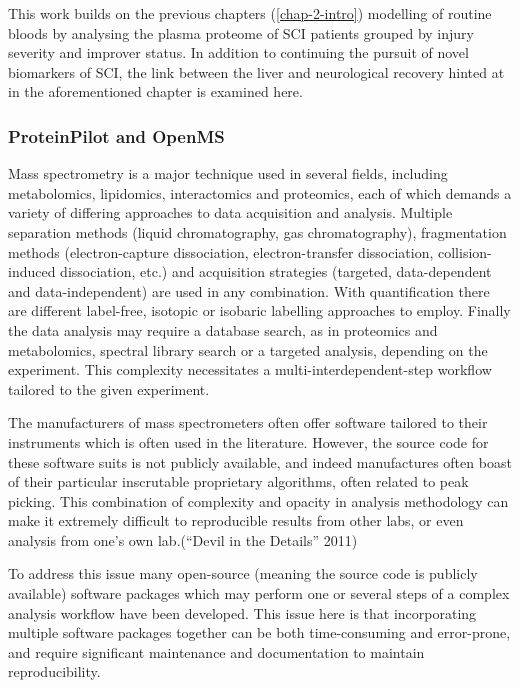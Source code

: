 \documentclass[9pt,lineno]{elife}
\begin{document}
This work builds on the previous chapters (\ref{chap-2-intro}) modelling of routine bloods by analysing the plasma proteome of SCI patients grouped by injury severity and improver status.
In addition to continuing the pursuit of novel biomarkers of SCI, the link between the liver and neurological recovery hinted at in the aforementioned chapter is examined here.

\hypertarget{proteinpilot-and-openms}{%
\subsubsection{ProteinPilot and OpenMS}\label{proteinpilot-and-openms}}

Mass spectrometry is a major technique used in several fields, including metabolomics, lipidomics, interactomics and proteomics, each of which demands a variety of differing approaches to data acquisition and analysis.
Multiple separation methods (liquid chromatography, gas chromatography), fragmentation methods (electron-capture dissociation, electron-transfer dissociation, collision-induced dissociation, etc.) and acquisition strategies (targeted, data-dependent and data-independent) are used in any combination.
With quantification there are different label-free, isotopic or isobaric labelling approaches to employ.
Finally the data analysis may require a database search, as in proteomics and metabolomics, spectral library search or a targeted analysis, depending on the experiment.
This complexity necessitates a multi-interdependent-step workflow tailored to the given experiment.

The manufacturers of mass spectrometers often offer software tailored to their instruments which is often used in the literature.
However, the source code for these software suits is not publicly available, and indeed manufactures often boast of their particular inscrutable proprietary algorithms, often related to peak picking.
This combination of complexity and opacity in analysis methodology can make it extremely difficult to reproducible results from other labs, or even analysis from one's own lab.({``Devil in the Details''} 2011)

To address this issue many open-source (meaning the source code is publicly available) software packages which may perform one or several steps of a complex analysis workflow have been developed.
This issue here is that incorporating multiple software packages together can be both time-consuming and error-prone, and require significant maintenance and documentation to maintain reproducibility.
\end{document}
